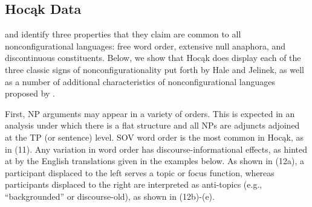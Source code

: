 \documentclass[output=paper]{LSP/langsci}
\begin{document}
\subsection{Hoc\k{a}k Data}

\citet{Hale1983} and \citet{Jelinek1984} identify three properties that they claim are common to all nonconfigurational languages: free word order, extensive null anaphora, and discontinuous constituents. Below, we show that Hoc\k{a}k does display each of the three classic signs of nonconfigurationality put forth by Hale and Jelinek, as well as a number of additional characteristics of nonconfigurational languages proposed by \citet{Baker1996}.  

First, NP arguments may appear in a variety of orders.  This is expected in an analysis under which there is a flat structure and all NPs are adjuncts adjoined at the TP (or sentence) level. SOV word order is the most common in Hoc\k{a}k, as in (11). Any variation in word order has discourse-informational effects, as hinted at by the English translations given in the examples below. As shown in (12a), a participant displaced to the left serves a topic or focus function, whereas participants displaced to the right are interpreted as anti-topics (e.g., ``backgrounded'' or discourse-old), as shown in (12b)-(e).
\end{document}
